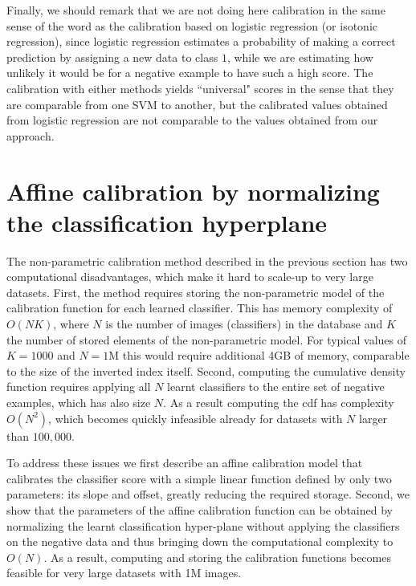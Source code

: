       Finally, we should remark that we are not doing here calibration in the same sense of the word as the calibration based on logistic regression (or isotonic regression), since logistic regression estimates a probability of making a correct prediction by assigning a new data to class $1$, while we are estimating how unlikely it would be for a negative example to have such a high score. The calibration with either methods yields ``universal" scores in the sense that they are comparable from one SVM to another, but the calibrated values obtained from logistic regression are not comparable to the values obtained from our approach.

\section{Affine calibration by normalizing the classification hyperplane}
\label{sec:calibrationRenorm}
  
  The non-parametric calibration method described in the previous section has two computational disadvantages, which make it hard to scale-up to very large datasets. 
  First, the method requires storing the non-parametric model of the calibration function for each learned classifier. This has memory complexity 
  of $O(NK)$, where $N$ is the number of images (classifiers) in the database and $K$ the number of stored elements of the non-parametric model. For typical values of $K=1000$ and $N=1$M this would require additional 4GB of memory, comparable to the size of the inverted index itself. Second, computing the cumulative density function requires applying all $N$ learnt classifiers to the entire set of negative examples, which has also size $N$. As a result computing the cdf has complexity $O(N^2)$, which becomes quickly infeasible already for datasets with $N$ larger than $100,000$. 
  
  To address these issues we first describe an affine calibration model that calibrates the classifier score with a simple linear function defined by only two parameters: its slope and offset, greatly reducing the required storage.
  Second, we show that the parameters of the affine calibration function can be obtained by normalizing the learnt classification hyper-plane without applying the classifiers on the negative data and thus bringing down the computational complexity to $O(N)$.
  As a result,  computing and storing the calibration functions becomes feasible for very large datasets with 1M images.

